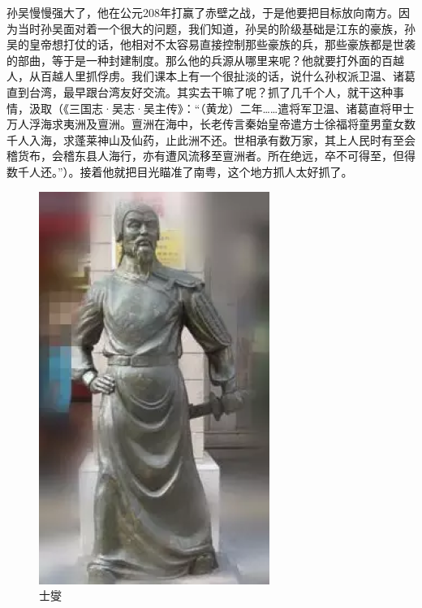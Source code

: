 孙吴慢慢强大了，他在公元208年打赢了赤壁之战，于是他要把目标放向南方。因为当时孙吴面对着一个很大的问题，我们知道，孙吴的阶级基础是江东的豪族，孙吴的皇帝想打仗的话，他相对不太容易直接控制那些豪族的兵，那些豪族都是世袭的部曲，等于是一种封建制度。那么他的兵源从哪里来呢？他就要打外面的百越人，从百越人里抓俘虏。我们课本上有一个很扯淡的话，说什么孙权派卫温、诸葛直到台湾，最早跟台湾友好交流。其实去干嘛了呢？抓了几千个人，就干这种事情，汲取（《三国志·吴志·吴主传》：“（黄龙）二年……遣将军卫温、诸葛直将甲士万人浮海求夷洲及亶洲。亶洲在海中，长老传言秦始皇帝遣方士徐福将童男童女数千人入海，求蓬莱神山及仙药，止此洲不还。世相承有数万家，其上人民时有至会稽货布，会稽东县人海行，亦有遭风流移至亶洲者。所在绝远，卒不可得至，但得数千人还。”）。接着他就把目光瞄准了南粤，这个地方抓人太好抓了。


\begin{figure}
	\centering
	\includegraphics[width=\textwidth]{images/image-16}
	\caption{士燮}
\end{figure}


